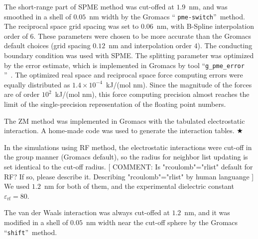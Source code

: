 \documentclass[a4paper,preprint,unsortedaddress,onecolumn,fleqn]{revtex4}
\newcommand{\recheck}[1]{{\color{red} #1}}
\begin{document}

The short-range part of SPME method was cut-offed at $1.9$~nm, and was
smoothed in a shell of $0.05$~nm width by the Gromacs \textquotedblleft 
\texttt{pme-switch}\textquotedblright\ method. The reciprocal space grid
spacing was set to $0.06$~nm, with B-Spline interpolation order of $6$.
These parameters were chosen to be more accurate than the Gromacs default
choices (grid spacing $0.12$~nm and interpolation order $4$).
The conducting boundary condition was used with SPME.
The splitting parameter was optimized by the error estimate, which is
implemented in Gromacs by tool \textquotedblleft \texttt{g\_pme\_error}%
\textquotedblright ~\cite{wang2010optimizing}. The optimized real space and
reciprocal space force computing errors were equally distributed as $%
1.4\times 10^{-4}$~kJ/(mol nm). Since the magnitude of the forces are of
order $10^{2}$~kJ/(mol nm), this force computing precision almost reaches
the limit of the single-precision representation of the floating point
numbers. %

The ZM method was implemented in Gromacs with the tabulated electrostatic
interaction. A home-made code was used to generate the interaction tables. {%
\color{blue} }$\bigstar $

In the simulations using RF method, the electrostatic interactions were cut-off in the
group manner (Gromacs default), so the radius for neighbor list updating is set identical to
the cut-off radius. [{\color{blue} COMMENT: Is "rcoulomb"="rlist" default
  for RF? If so, please describe it.} \recheck{Describing "rcoulomb"="rlist" by human languange} ]
\recheck{We used $1.2$~nm for both of them}, and the experimental dielectric constant $%
\varepsilon _{\text{rf}}=80$.

The van der Waals interaction was always cut-offed at $1.2$~nm, and it was
modified in a shell of $0.05$~nm width near the cut-off sphere by the
Gromacs \textquotedblleft \texttt{shift}\textquotedblright\ method.
\end{document}
